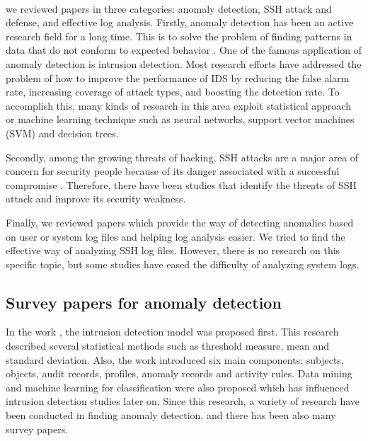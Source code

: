 \documentclass [11pt]{article}
\begin{document}
\paragraph{} 

we reviewed papers in three categories: anomaly detection, SSH attack and defense, and effective log analysis. Firstly, anomaly detection has been an active research field for a long time. This is to solve the problem of finding patterns in data that do not conform to expected behavior \cite{chandola2009anomaly}. One of the famous application of anomaly detection is intrusion detection. Most research efforts have addressed the problem of how to improve the performance of IDS by reducing the false alarm rate, increasing coverage of attack types, and boosting the detection rate. To accomplish this, many kinds of research in this area exploit statistical approach or machine learning technique such as neural networks, support vector machines (SVM) and decision trees.    

Secondly, among the growing threats of hacking, SSH attacks are a major area of concern for security people because of its danger associated with a successful compromise \cite{hellemons2012sshcure}. Therefore, there have been studies that identify the threats of SSH attack and improve its security weakness. 

Finally, we reviewed papers which provide the way of detecting anomalies based on user or system log files and helping log analysis easier. We tried to find the effective way of analyzing SSH log files. However, there is no research on this specific topic, but some studies have eased the difficulty of analyzing system logs. 

\subsection{Survey papers for anomaly detection}
In the work \cite{denning1987intrusion}, the intrusion detection model was proposed first. This research described several statistical methods such as threshold measure, mean and standard deviation. Also, the work introduced six main components: subjects, objects, audit records, profiles, anomaly records and activity rules. Data mining and machine learning for classification were also proposed which has influenced intrusion detection studies later on. Since this research, a variety of research have been conducted in finding anomaly detection, and there has been also many survey papers.
\end{document}
